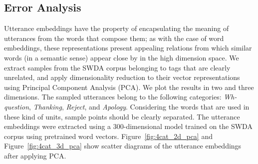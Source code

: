 \subsection{Error Analysis}
Utterance embeddings have the property of encapsulating the meaning of utterances from the words that compose them; as with the case of word embeddings, these representations present appealing relations from which similar words (in a semantic sense) appear close by in the high dimension space.
We extract samples from the SWDA corpus belonging to tags that are clearly unrelated, and apply dimensionality reduction to their vector representations using Principal Component Analysis (PCA).
We plot the results in two and three dimensions.
The sampled utterances belong to the following categories: \emph{Wh-question}, \emph{Thanking}, \emph{Reject}, and \emph{Apology}.
Considering the words that are used in these kind of units, sample points should be clearly separated.
The utterance embeddings were extracted using a 300-dimensional model trained on the SWDA corpus using pretrained word vectors.
Figure~\ref{fig:4cat_2d_pca} and Figure~\ref{fig:4cat_3d_pca} show scatter diagrams of the utterance embeddings after applying PCA.

